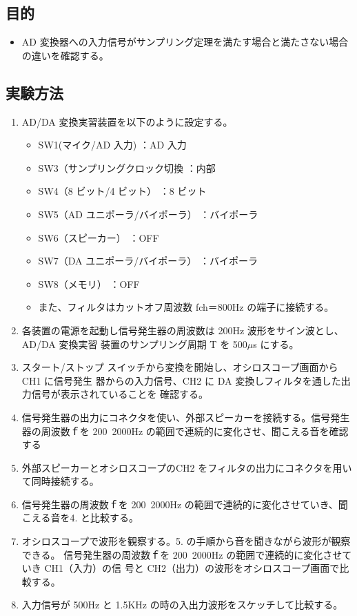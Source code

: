 \documentclass[10pt]{article}
\begin{document}
\subsection{目的}
\begin{itemize}
    \item AD 変換器への入力信号がサンプリング定理を満たす場合と満たさない場合の違いを確認する。
\end{itemize}

\subsection{実験方法}

\begin{enumerate}
    \item AD/DA 変換実習装置を以下のように設定する。 
    \begin{itemize}
        \item SW1(マイク/AD 入力)  ：AD 入力 
        \item SW3（サンプリングクロック切換 ：内部 
        \item SW4（8 ビット/4 ビット）  ：8 ビット 
        \item SW5（AD ユニポーラ/バイポーラ） ：バイポーラ 
        \item SW6（スピーカー）  ：OFF 
        \item SW7（DA ユニポーラ/バイポーラ） ：バイポーラ 
        \item SW8（メモリ）   ：OFF
        \item また、フィルタはカットオフ周波数 fch＝800Hz の端子に接続する。 
    \end{itemize} 
    \item 各装置の電源を起動し信号発生器の周波数は 200Hz 波形をサイン波とし、AD/DA 変換実習 装置のサンプリング周期 T を 500$\mu$s にする。 
    \item スタート/ストップ スイッチから変換を開始し、オシロスコープ画面から CH1 に信号発生 器からの入力信号、CH2 に DA 変換しフィルタを通した出力信号が表示されていることを 確認する。
    \item 信号発生器の出力にコネクタを使い、外部スピーカーを接続する。信号発生器の周波数ｆを 200~2000Hz の範囲で連続的に変化させ、聞こえる音を確認する
    \item 外部スピーカーとオシロスコープのCH2 をフィルタの出力にコネクタを用いて同時接続する。
    \item 信号発生器の周波数ｆを 200~2000Hz の範囲で連続的に変化させていき、聞こえる音を4. と比較する。 
    \item オシロスコープで波形を観察する。5. の手順から音を聞きながら波形が観察できる。 信号発生器の周波数ｆを 200~2000Hz の範囲で連続的に変化させていき CH1（入力）の信 号と CH2（出力）の波形をオシロスコープ画面で比較する。 
    \item 入力信号が 500Hz と 1.5KHz の時の入出力波形をスケッチして比較する。
\end{enumerate}
\end{document}
